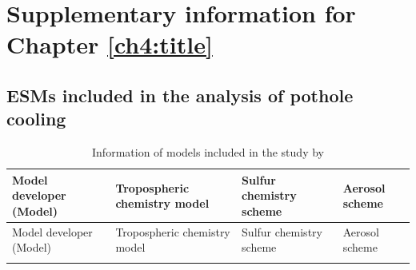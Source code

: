 \chapter{Supplementary information for Chapter \ref{ch4:title}} 

\section{ESMs included in the analysis of pothole cooling}

\begin{small}
\begin{longtable}{>{\raggedright}p{3.25cm} >{\raggedright}p{3.25cm} >{\raggedright}p{3.5cm} >{\raggedright\arraybackslash}p{3.5cm}}
    \caption[Information of models included in the study by \citet{zhangRoleAnthropogenicAerosols2021}]{Information of models included in the study by \citet{zhangRoleAnthropogenicAerosols2021}}
    \label{tab:zhang-model}
    \\
    \toprule
     Model developer (Model) & Tropospheric chemistry model & Sulfur chemistry scheme & Aerosol scheme \\
     \midrule
     \endfirsthead

    \toprule
     Model developer (Model) & Tropospheric chemistry model & Sulfur chemistry scheme & Aerosol scheme \\
     \midrule
     \endhead
     
     \bottomrule
     \endlastfoot


\end{longtable}
\end{small}
